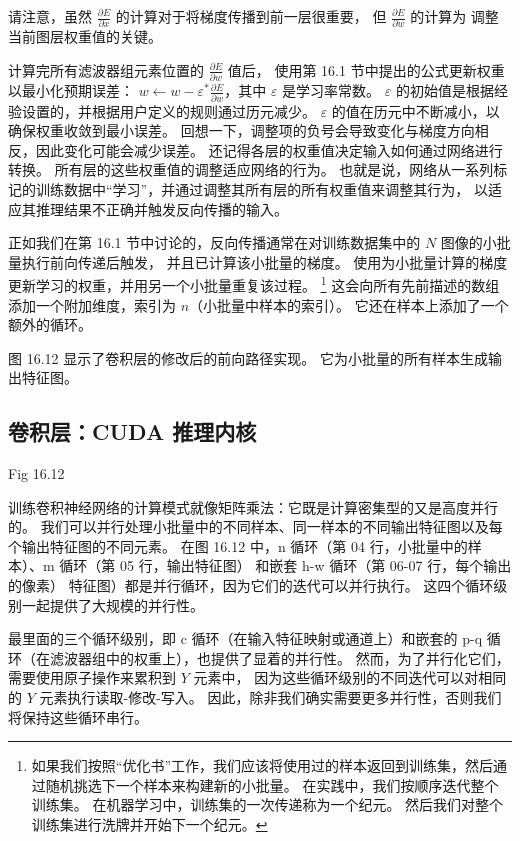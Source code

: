 请注意，虽然 $\frac{\partial E}{\partial x}$ 的计算对于将梯度传播到前一层很重要，
但 $\frac{\partial E}{\partial w}$ 的计算为 调整当前图层权重值的关键。

计算完所有滤波器组元素位置的 $\frac{\partial E}{\partial w}$ 值后，
使用第 16.1 节中提出的公式更新权重以最小化预期误差： $w \leftarrow w-\varepsilon^{*} \frac{\partial E}{\partial w}$，其中 $\varepsilon$ 是学习率常数。 
$\varepsilon$ 的初始值是根据经验设置的，并根据用户定义的规则通过历元减少。 
$\varepsilon$ 的值在历元中不断减小，以确保权重收敛到最小误差。 
回想一下，调整项的负号会导致变化与梯度方向相反，因此变化可能会减少误差。 
还记得各层的权重值决定输入如何通过网络进行转换。 所有层的这些权重值的调整适应网络的行为。 
也就是说，网络从一系列标记的训练数据中“学习”，并通过调整其所有层的所有权重值来调整其行为，
以适应其推理结果不正确并触发反向传播的输入。

正如我们在第 16.1 节中讨论的，反向传播通常在对训练数据集中的 $N$ 图像的小批量执行前向传递后触发，
并且已计算该小批量的梯度。 使用为小批量计算的梯度更新学习的权重，并用另一个小批量重复该过程。 
\footnote{如果我们按照“优化书”工作，我们应该将使用过的样本返回到训练集，然后通过随机挑选下一个样本来构建新的小批量。 
在实践中，我们按顺序迭代整个训练集。 在机器学习中，训练集的一次传递称为一个纪元。 
然后我们对整个训练集进行洗牌并开始下一个纪元。}
这会向所有先前描述的数组添加一个附加维度，索引为 $n$（小批量中样本的索引）。 
它还在样本上添加了一个额外的循环。

图 16.12 显示了卷积层的修改后的前向路径实现。 它为小批量的所有样本生成输出特征图。

\subsection{卷积层：CUDA 推理内核}
{\color{red} Fig 16.12}

训练卷积神经网络的计算模式就像矩阵乘法：它既是计算密集型的又是高度并行的。 
我们可以并行处理小批量中的不同样本、同一样本的不同输出特征图以及每个输出特征图的不同元素。 
在图 16.12 中，n 循环（第 04 行，小批量中的样本）、m 循环（第 05 行，输出特征图）
和嵌套 h-w 循环（第 06-07 行，每个输出的像素） 特征图）都是并行循环，因为它们的迭代可以并行执行。 
这四个循环级别一起提供了大规模的并行性。

最里面的三个循环级别，即 c 循环（在输入特征映射或通道上）和嵌套的 p-q 循环（在滤波器组中的权重上），也提供了显着的并行性。 
然而，为了并行化它们，需要使用原子操作来累积到 $Y$ 元素中，
因为这些循环级别的不同迭代可以对相同的 $Y$ 元素执行读取-修改-写入。 
因此，除非我们确实需要更多并行性，否则我们将保持这些循环串行。

